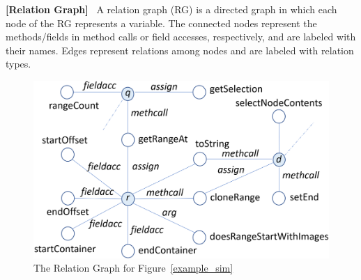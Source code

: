 


\begin{definition}{\bf [Relation Graph]}~\cite{icse19}
A relation graph (RG) is a directed graph
%
in which each node of the RG represents a variable. The connected
nodes represent the methods/fields in method calls or field accesses,
respectively, and are labeled with their names. Edges represent
relations among nodes and are labeled with relation types.
\end{definition}

%

\begin{figure}[t]
	\begin{center}
		\includegraphics[width=0.9\columnwidth]{figures/relation-graph}
		\caption{The Relation Graph for Figure~\ref{example_sim}}
		\label{rel-graph}
	\end{center}
\end{figure}

